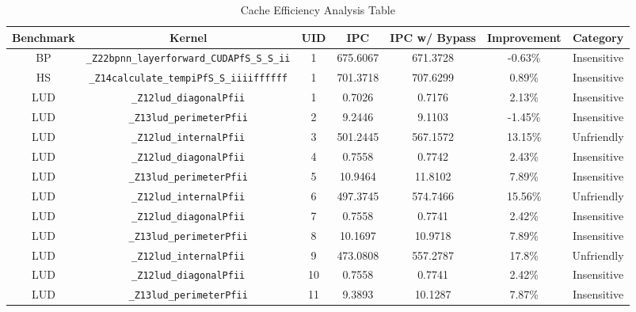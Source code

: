 \documentclass{article}
\begin{document}
\begin{table}[H]
	\small
	\caption{Cache Efficiency Analysis Table} %
	\centering %
	\begin{tabular}{c c c c c c c} %
		\hline\hline %
		Benchmark & Kernel                                         & UID & IPC      & IPC w/ Bypass & Improvement & Category    \\ [0.5ex] %
		\hline %
		BP        & \verb|_Z22bpnn_layerforward_CUDAPfS_S_S_ii|    & 1   & 675.6067 & 671.3728      & -0.63\%     & Insensitive \\
		HS        & \verb|_Z14calculate_tempiPfS_S_iiiiffffff|     & 1   & 701.3718 & 707.6299      & 0.89\%      & Insensitive \\
		LUD       & \verb|_Z12lud_diagonalPfii|                    & 1   & 0.7026   & 0.7176        & 2.13\%      & Insensitive \\
		LUD       & \verb|_Z13lud_perimeterPfii|                   & 2   & 9.2446   & 9.1103        & -1.45\%     & Insensitive \\
		LUD       & \verb|_Z12lud_internalPfii|                    & 3   & 501.2445 & 567.1572      & 13.15\%     & Unfriendly  \\
		LUD       & \verb|_Z12lud_diagonalPfii|                    & 4   & 0.7558   & 0.7742        & 2.43\%      & Insensitive \\
		LUD       & \verb|_Z13lud_perimeterPfii|                   & 5   & 10.9464  & 11.8102       & 7.89\%      & Insensitive \\
		LUD       & \verb|_Z12lud_internalPfii|                    & 6   & 497.3745 & 574.7466      & 15.56\%     & Unfriendly  \\
		LUD       & \verb|_Z12lud_diagonalPfii|                    & 7   & 0.7558   & 0.7741        & 2.42\%      & Insensitive \\
		LUD       & \verb|_Z13lud_perimeterPfii|                   & 8   & 10.1697  & 10.9718       & 7.89\%      & Insensitive \\
		LUD       & \verb|_Z12lud_internalPfii|                    & 9   & 473.0808 & 557.2787      & 17.8\%      & Unfriendly  \\
		LUD       & \verb|_Z12lud_diagonalPfii|                    & 10  & 0.7558   & 0.7741        & 2.42\%      & Insensitive \\
		LUD       & \verb|_Z13lud_perimeterPfii|                   & 11  & 9.3893   & 10.1287       & 7.87\%      & Insensitive \\

\end{tabular}
\end{table}
\end{document}
